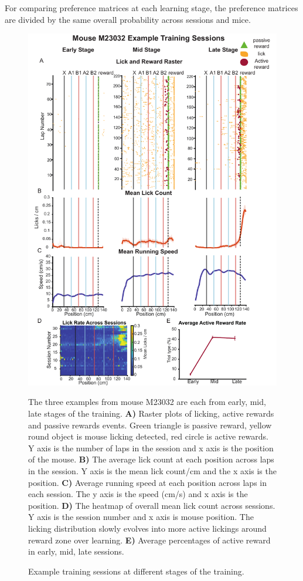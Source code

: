 For comparing preference matrices at each learning stage, the preference matrices are divided by the same overall probability across sessions and mice.

\begin{figure}
    \centering
    \includegraphics[width=1\linewidth]{figures//Chapter 3 Behaviour//Thesis Figures//figure_PDFs/fig2_example_sessions.pdf}
    \caption{Example training sessions at different stages of the training.}
\medskip
\small
 The three examples from mouse M23032 are each from early, mid, late stages of the training. \textbf{A)} Raster plots of licking, active rewards and passive rewards events. Green triangle is passive reward, yellow round object is mouse licking detected, red circle is active rewards. Y axis is the number of laps in the session and x axis is the position of the mouse. \textbf{B)} The average lick count at each position across laps in the session. Y axis is the mean lick count/cm and the x axis is the position. \textbf{C)} Average running speed at each position across laps in each session. The y axis is the speed (cm/s) and x axis is the position. \textbf{D)} The heatmap of overall mean lick count across sessions. Y axis is the session number and x axis is mouse position. The licking distribution slowly evolves into more active lickings around reward zone over learning. \textbf{E)} Average percentages of active reward in early, mid, late sessions. 
    \label{fig:example training sessions}
\end{figure}



